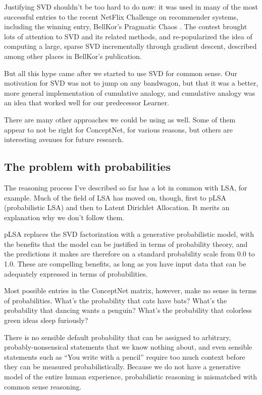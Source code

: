 \documentclass[11pt]{article}
\begin{document}
Justifying SVD shouldn't be too hard to do now: it was used in many of the most
successful entries to the recent NetFlix Challenge on recommender systems,
including the winning entry, BellKor's Pragmatic Chaos \cite{bellkor}. The
contest brought lots of attention to SVD and its related methods, and
re-popularized the idea of computing a large, sparse SVD incrementally through
gradient descent, described among other places in BellKor's publication.

But all this hype came after we started to use SVD for common sense. Our
motivation for SVD was not to jump on any bandwagon, but that it was a better,
more general implementation of cumulative analogy, and cumulative analogy was
an idea that worked well for our predecessor {\sc Learner}. 

There are many other approaches we could be using as well. Some of them appear
to not be right for ConceptNet, for various reasons, but others are interesting
avenues for future research.

\subsection{The problem with probabilities}

The reasoning process I've described so far has a lot in common with LSA, for
example. Much of the field of LSA has moved on, though, first to pLSA
(probabilistic LSA) and then to Latent Dirichlet Allocation. It merits an
explanation why we don't follow them.

pLSA \cite{plsa} replaces the SVD factorization with a generative probabilistic
model, with the benefits that the model can be justified in terms of
probability theory, and the predictions it makes are therefore on a standard
probability scale from 0.0 to 1.0. These are compelling benefits, as long as
you have input data that can be adequately expressed in terms of probabilities.

Most possible entries in the ConceptNet matrix, however, make no sense in terms
of probabilities.  What's the probability that cats have bats? What's the
probability that dancing wants a penguin? What's the probability that colorless
green ideas sleep furiously?

There is no sensible default probability that can be assigned to arbitrary,
probably-nonsensical statements that we know nothing about, and even sensible
statements such as ``You write with a pencil'' require too much context before
they can be measured probabilistically. Because we do not have a generative
model of the entire human experience, probabilistic reasoning is mismatched
with common sense reasoning.
\end{document}
